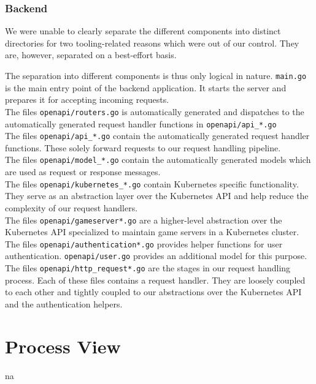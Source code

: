 \documentclass[a4paper,12pt,chapterprefix=false,bibliography=totoc,listof=totoc,]{scrreprt}
\begin{document}
\subsection{Backend}
We were unable to clearly separate the different components into distinct directories for two tooling-related reasons which were out of our control. They are, however, separated on a best-effort basis.

The separation into different components is thus only logical in nature.
\texttt{main.go} is the main entry point of the backend application. It starts the server and prepares it for accepting incoming requests. \\
The files \texttt{openapi/routers.go} is automatically generated and dispatches to the automatically generated request handler functions in \texttt{openapi/api\_*.go} \\
The files \texttt{openapi/api\_*.go} contain the automatically generated request handler functions. These solely forward requests to our request handling pipeline. \\
The files \texttt{openapi/model\_*.go} contain the automatically generated models which are used as request or response messages. \\
The files \texttt{openapi/kubernetes\_*.go} contain Kubernetes specific functionality. They serve as an abstraction layer over the Kubernetes API and help reduce the complexity of our request handlers. \\
The files \texttt{openapi/gameserver*.go} are a higher-level abstraction over the Kubernetes API specialized to maintain game servers in a Kubernetes cluster.  \\
The files \texttt{openapi/authentication*.go} provides helper functions for user authentication. \texttt{openapi/user.go} provides an additional model for this purpose. \\
The files \texttt{openapi/http\_request*.go} are the stages in our request handling process. Each of these files contains a request handler. They are loosely coupled to each other and tightly coupled to our abstractions over the Kubernetes API and the authentication helpers.

\chapter{Process View}
\gls{na}
\end{document}
